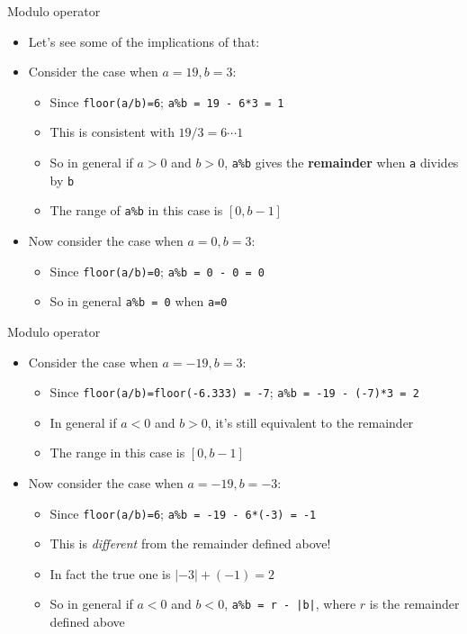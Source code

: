 \documentclass[10pt,xcolor={table,dvipsnames},t]{beamer}
\begin{document}
\begin{frame}{Modulo operator}
  \begin{itemize}
    \item Let's see some of the implications of that:
    \item Consider the case when $a=19,b=3$:
    \begin{itemize}
      \item Since \texttt{floor(a/b)=6}; \texttt{a\%b = 19 - 6*3 = 1}
      \item This is consistent with $19/3 = 6 \cdots 1$
      \item So in general if $a>0$ and $b>0$, \texttt{a\%b} gives the \textbf{remainder} when \texttt{a} divides by \texttt{b}
      \item The range of \texttt{a\%b} in this case is $[0,b-1]$
    \end{itemize}

    \vspace{1mm}
    \item Now consider the case when $a=0, b=3$:
    \begin{itemize}
      \item Since \texttt{floor(a/b)=0}; \texttt{a\%b = 0 - 0 = 0}
      \item So in general \texttt{a\%b = 0} when \texttt{a=0}
    \end{itemize}

  \end{itemize}
  
\end{frame}


\begin{frame}{Modulo operator}
  \begin{itemize}
    \item Consider the case when $a=-19,b=3$:
    \begin{itemize}
      \item Since \texttt{floor(a/b)=floor(-6.333) = -7}; \texttt{a\%b = -19 - (-7)*3 = 2}
      \item In general if $a<0$ and $b>0$, it's still equivalent to the remainder
      \item The range in this case is $[0,b-1]$
    \end{itemize}

    \vspace{1mm}
    \item Now consider the case when $a=-19, b=-3$:
    \begin{itemize}
      \item Since \texttt{floor(a/b)=6}; \texttt{a\%b = -19 - 6*(-3) = -1}
      \item This is \textit{different} from the remainder defined above!
      \item In fact the true one is $|-3| + (-1) = 2$
      \item So in general if $a<0$ and $b<0$, \texttt{a\%b = r - |b|}, where $r$ is the remainder defined above
    \end{itemize}
  \end{itemize}
  
\end{frame}
\end{document}
